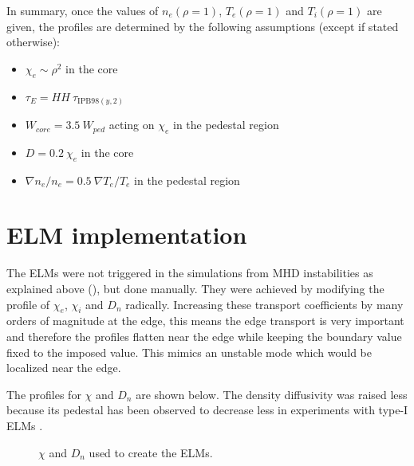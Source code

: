In summary, once the values of $n_e( \rho = 1 )$, $T_e( \rho = 1 )$ and $T_i( \rho = 1 )$ are given, the profiles are determined by the following assumptions (except if stated otherwise):
\begin{itemize}
	\item $\chi_e \sim \rho^2$ in the core
	\item $\tau_E = H\!H\ \tau_{\mathrm{IPB}98(y,2)}$
	\item $W_{core} = 3.5\ W_{ped}$ acting on $\chi_e$ in the pedestal region
	\item $D = 0.2\ \chi_e$ in the core
	\item $\nabla n_e / n_e = 0.5\ \nabla T_e / T_e$ in the pedestal region
\end{itemize}

\section{ELM implementation}\label{sec:sim:ELM}
The ELMs were not triggered in the simulations from MHD instabilities as explained above (), but done manually. They were achieved by modifying the profile of $\chi_e$, $\chi_i$ and $D_n$ radically. Increasing these transport coefficients by many orders of magnitude at the edge, this means the edge transport is very important and therefore the profiles flatten near the edge while keeping the boundary value fixed to the imposed value. This mimics an unstable mode which would be localized near the edge.

The profiles for $\chi$ and $D_n$ are shown below. The density diffusivity was raised less because its pedestal has been observed to decrease less in experiments with type-I ELMs \cite{andreas2010}.

\begin{figure}[H]
\vspace{-2mm}
\begin{center}
\hspace{3mm}
\vspace{-7mm}
\end{center}
\caption{\footnotesize $\chi$ and $D_n$ used to create the ELMs.\label{fig:sim:ELM:chiDnELM}}
\vspace{-5mm}
\end{figure}


